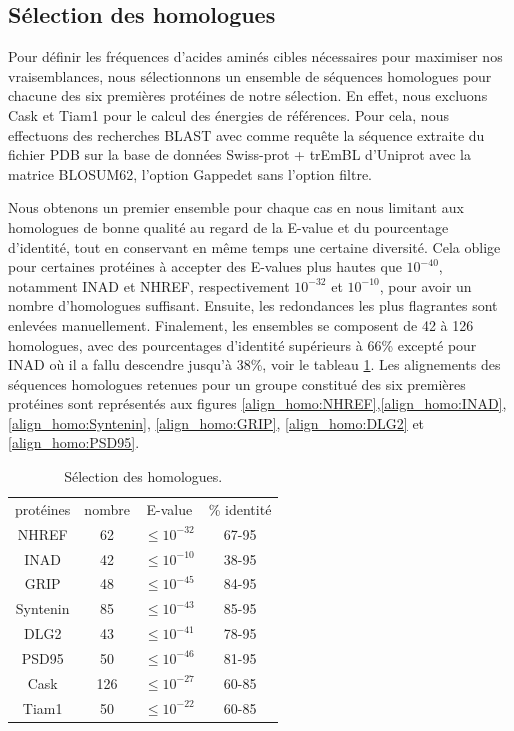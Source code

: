\subsection{Sélection des homologues}

Pour définir les fréquences d'acides aminés cibles nécessaires pour maximiser nos vraisemblances, nous sélectionnons un ensemble de séquences homologues pour chacune des six premières protéines de notre sélection. En effet, nous excluons Cask et Tiam1 pour le calcul des énergies de références. Pour cela, nous effectuons des recherches BLAST avec comme requête la séquence extraite du fichier PDB sur la base de données \og Swiss-prot + trEmBL \fg d'Uniprot avec la matrice BLOSUM62, l'option \og Gapped\fg et sans l'option \og filtre\fg.

Nous obtenons un premier ensemble pour chaque cas en nous limitant aux homologues de bonne qualité au regard de la E-value et du pourcentage d'identité, tout en conservant en même temps une certaine diversité. Cela oblige pour certaines protéines à accepter des E-values plus hautes que $10^{-40}$, notamment INAD et NHREF, respectivement $10^{-32}$ et $10^{-10}$, pour avoir un nombre d'homologues suffisant. Ensuite, les redondances les plus flagrantes sont enlevées manuellement. Finalement, les ensembles se composent de 42 à 126 homologues, avec des pourcentages d'identité supérieurs à 66\% excepté pour INAD où il a fallu descendre jusqu'à 38\%, voir le tableau \ref{tab:select_homo}. Les alignements des séquences homologues retenues pour un groupe constitué des six premières protéines sont représentés aux figures \ref{align_homo:NHREF},\ref{align_homo:INAD}, \ref{align_homo:Syntenin}, \ref{align_homo:GRIP}, \ref{align_homo:DLG2} et \ref{align_homo:PSD95}.


    \begin{table}[!htbp]
      \centering
      \caption{Sélection des homologues.}
      \begin{tabular}{cccc}

        \toprule
        protéines & nombre & E-value & \% identité \\
        \cmidrule{1-4}
     NHREF     & 62  &    $\leqslant 10^{-32}$  &  67-95 \\
     INAD      & 42  &    $\leqslant 10^{-10}$  &  38-95 \\
     GRIP      & 48  &    $\leqslant 10^{-45}$  &  84-95 \\
     Syntenin  & 85  &    $\leqslant 10^{-43}$  &  85-95 \\
     DLG2      & 43  &    $\leqslant 10^{-41}$  &  78-95 \\
     PSD95     & 50  &    $\leqslant 10^{-46}$  &  81-95 \\
     \cmidrule{1-4}
     Cask      & 126 &    $\leqslant 10^{-27}$  &  60-85 \\
     Tiam1     & 50  &    $\leqslant 10^{-22}$  &  60-85 \\

        \bottomrule

      \end{tabular}      
      \label{tab:select_homo}
    \end{table}

